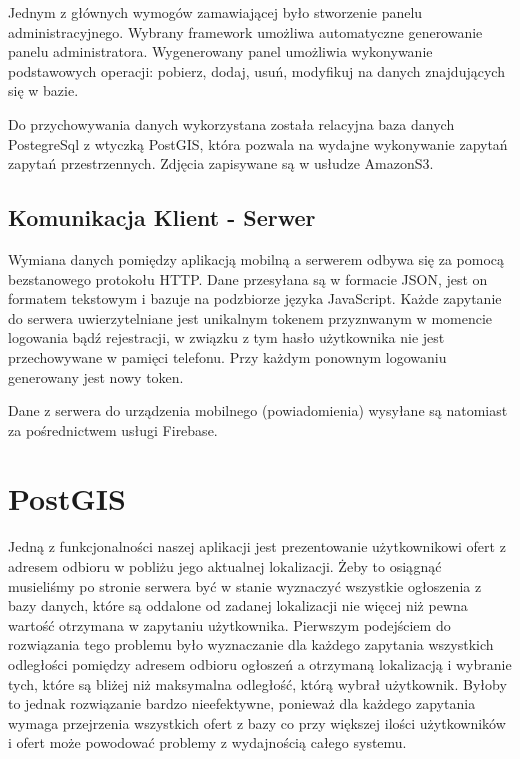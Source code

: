 \documentclass[licencjacka]{pracamgr}
\begin{document}
Jednym z głównych wymogów zamawiającej było stworzenie panelu administracyjnego. Wybrany framework umożliwa automatyczne generowanie panelu administratora. Wygenerowany panel umożliwia wykonywanie podstawowych operacji: pobierz, dodaj, usuń, modyfikuj na danych znajdujących się w bazie. 

Do przychowywania danych wykorzystana została relacyjna baza danych PostegreSql z wtyczką PostGIS, która pozwala na wydajne wykonywanie zapytań zapytań przestrzennych. Zdjęcia zapisywane są w usłudze AmazonS3.

\subsection{Komunikacja Klient - Serwer} 
Wymiana danych pomiędzy aplikacją mobilną a serwerem odbywa się za pomocą bezstanowego protokołu HTTP. Dane przesyłana są w formacie JSON, jest on formatem tekstowym i bazuje na podzbiorze języka JavaScript. Każde zapytanie do serwera uwierzytelniane jest unikalnym tokenem przyznwanym w momencie logowania bądź rejestracji, w związku z tym hasło użytkownika nie jest przechowywane w pamięci telefonu. Przy każdym ponownym logowaniu generowany jest nowy token. 

Dane z serwera do urządzenia mobilnego (powiadomienia) wysyłane są natomiast za pośrednictwem usługi Firebase.

\section{PostGIS}
Jedną z funkcjonalności naszej aplikacji jest prezentowanie użytkownikowi ofert z adresem odbioru w pobliżu jego aktualnej lokalizacji. Żeby to osiągnąć musieliśmy po stronie serwera być w stanie wyznaczyć wszystkie ogłoszenia z bazy danych, które są oddalone od zadanej lokalizacji nie więcej niż pewna wartość otrzymana w zapytaniu użytkownika. Pierwszym podejściem do rozwiązania tego problemu było wyznaczanie dla każdego zapytania wszystkich odległości pomiędzy adresem odbioru ogłoszeń a otrzymaną lokalizacją i wybranie tych, które są bliżej niż maksymalna odległość, którą wybrał użytkownik. Byłoby to jednak rozwiązanie bardzo nieefektywne, ponieważ dla każdego zapytania wymaga przejrzenia wszystkich ofert z bazy co przy większej ilości użytkowników i ofert może powodować problemy z wydajnością całego systemu.
\end{document}
